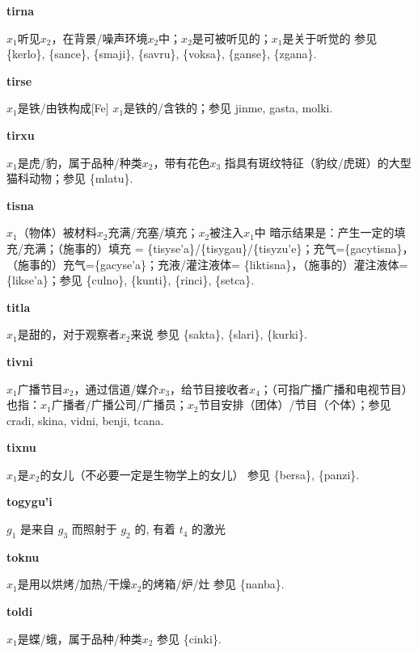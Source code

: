 \documentclass[notitlepage,twocolumn,a4paper,10pt]{book}
\begin{document}
{\sffamily\bfseries tirna}\enspace {\ttfamily\bfseries[tin]}  $x_1$听见$x_2$，在背景\slash{}噪声环境$x_2$中；$x_2$是可被听见的；$x_1$是关于听觉的 \textemdash{} 参见 \{kerlo\}, \{sance\}, \{smaji\}, \{savru\}, \{voksa\}, \{ganse\}, \{zgana\}.

{\sffamily\bfseries tirse}\enspace {\ttfamily\bfseries[tir]}  $x_1$是铁\slash{}由铁构成[Fe] \textemdash{} $x_1$是铁的\slash{}含铁的；参见 {jinme}, {gasta}, {molki}.

{\sffamily\bfseries tirxu} $x_1$是虎\slash{}豹，属于品种\slash{}种类$x_2$，带有花色$x_3$ \textemdash{} 指具有斑纹特征（豹纹\slash{}虎斑）的大型猫科动物；参见 \{mlatu\}.

{\sffamily\bfseries tisna}\enspace {\ttfamily\bfseries[tis]}  $x_1$（物体）被材料$x_2$充满\slash{}充塞\slash{}填充；$x_2$被注入$x_1$中 \textemdash{} 暗示结果是：产生一定的填充\slash{}充满；（施事的）填充 = \{tisyse'a\}\slash{}\{tisygau\}\slash{}\{tisyzu'e\}；充气=\{gacytisna\}，（施事的）充气=\{gacyse'a\}；充液\slash{}灌注液体= \{liktisna\}，（施事的）灌注液体=\{likse'a\}；参见 \{culno\}, \{kunti\}, \{rinci\}, \{setca\}.

{\sffamily\bfseries titla}\enspace {\ttfamily\bfseries[tit]}  $x_1$是甜的，对于观察者$x_2$来说 \textemdash{} 参见 \{sakta\}, \{slari\}, \{kurki\}.

{\sffamily\bfseries tivni}\enspace {\ttfamily\bfseries[tiv]}  $x_1$广播节目$x_2$，通过信道\slash{}媒介$x_3$，给节目接收者$x_4$；（可指广播广播和电视节目） \textemdash{} 也指：$x_1$广播者\slash{}广播公司\slash{}广播员；$x_2$节目安排（团体）\slash{}节目（个体）；参见 {cradi}, {skina}, {vidni}, {benji}, {tcana}.

{\sffamily\bfseries tixnu}\enspace {\ttfamily\bfseries[tix     ti'u]}  $x_1$是$x_2$的女儿（不必要一定是生物学上的女儿） \textemdash{} 参见 \{bersa\}, \{panzi\}.

{\sffamily\bfseries togygu'i} $g_1$ 是来自 $g_3$ 而照射于 $g_2$ 的, 有着 $t_4$ 的激光

{\sffamily\bfseries toknu}\enspace {\ttfamily\bfseries[tok]}  $x_1$是用以烘烤\slash{}加热\slash{}干燥$x_2$的烤箱\slash{}炉\slash{}灶 \textemdash{} 参见 \{nanba\}.

{\sffamily\bfseries toldi}\enspace {\ttfamily\bfseries[tod]}  $x_1$是蝶\slash{}蛾，属于品种\slash{}种类$x_2$ \textemdash{} 参见 \{cinki\}.
\end{document}
